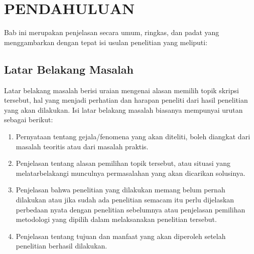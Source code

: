 
\chapter[PENDAHULUAN]{\\ PENDAHULUAN}

Bab ini merupakan penjelasan secara umum, ringkas, dan padat yang menggambarkan dengan tepat isi usulan penelitian yang meliputi:

\section{Latar Belakang Masalah}
\begin{sectioncontent}
    \hspace{\parindent}Latar belakang masalah berisi uraian mengenai alasan memilih topik skripsi tersebut, hal yang menjadi perhatian dan harapan peneliti dari hasil penelitian yang akan dilakukan. Isi latar belakang masalah biasanya mempunyai urutan sebagai berikut:
    
    \begin{enumerate}[leftmargin=0.5cm,label=\alph*.]
        \item Pernyataan tentang gejala/fenomena yang akan diteliti, boleh diangkat dari masalah teoritis atau dari masalah praktis.
        \item Penjelasan tentang alasan pemilihan topik tersebut, atau situasi yang melatarbelakangi munculnya permasalahan yang akan dicarikan solusinya.
        \item Penjelasan bahwa penelitian yang dilakukan memang belum pernah dilakukan atau jika sudah ada penelitian semacam itu perlu dijelaskan perbedaan nyata dengan penelitian sebelumnya atau penjelasan pemilihan metodologi yang dipilih dalam melaksanakan penelitian tersebut.
        \item Penjelasan tentang tujuan dan manfaat yang akan diperoleh setelah penelitian berhasil dilakukan.
    \end{enumerate}
\end{sectioncontent}


